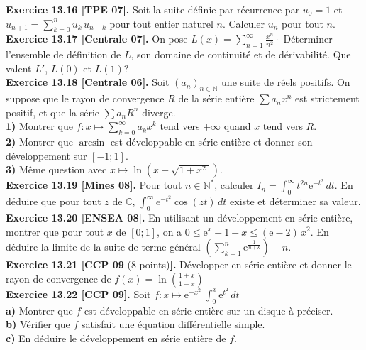 \documentclass[a4paper,12pt,francais]{article}
\newcommand{\field}[1]{\mathbb{#1}}
\newcommand{\N}{\field{N}}
\newcommand{\C}{\field{C}}
\newcommand{\e}{\mbox{e}}
\newcommand{\dis}{\displaystyle}
\begin{document}
\noindent
{\bf Exercice 13.16 [TPE 07].} Soit la suite définie par récurrence par $u_0=1$ et $\displaystyle u_{n+1}=\sum_{k=0}^n u_k \, u_{n-k}$ pour tout entier naturel $n$. Calculer $u_n$ pour tout $n$.\\

\noindent
{\bf Exercice 13.17 [Centrale 07].} On pose $\displaystyle L(x)=\sum_{n=1}^\infty \frac{x^n}{n^2}\cdot$ Déterminer l'ensemble de définition de $L$, son domaine de continuité et de dérivabilité. Que valent $L'$, $L(0)$ et $L(1)$?\\

\noindent
{\bf Exercice 13.18 [Centrale 06].} Soit $(a_n)_{n\in \N}$ une suite de réels positifs. On suppose que le rayon de convergence $R$ de la série entière $\sum a_n x^n$ est strictement positif, et que la série $\sum a_n R^n$ diverge.\\
\indent
{\bf 1)} Montrer que $f:x\mapsto \displaystyle \sum_{k=0}^\infty a_k x^k$ tend vers $+\infty$ quand $x$ tend vers $R$.\\
\indent
{\bf 2)} Montrer que $\arcsin$ est développable en série entière et donner son développement sur $[-1;1]$.\\
\indent
{\bf 3)} Même question avec $x\mapsto \ln \left( x+\sqrt{1+x^2\;} \right)$.\\

\noindent
{\bf Exercice 13.19 [Mines 08].} Pour tout $n\in \N^*$, calculer $I_n=\int_0^\infty t^{2n} \e^{-t^2}\, dt$. En déduire que pour tout $z$ de $\C$, $\int_0^\infty e^{-t^2} \cos(zt)\, dt$ existe et déterminer sa valeur.\\  

\noindent
{\bf Exercice 13.20 [ENSEA 08].} En utilisant un développement en série entière, montrer que pour tout $x$ de $[0;1]$, on a 
$0 \leqslant \e^x-1-x \leqslant (\e-2) \,x^2$. En déduire la limite de la suite de terme général $\displaystyle \left( 
\sum_{k=1}^n \e^{\frac{1}{n+k}} \right) -n$.\\

\noindent
{\bf Exercice 13.21 [CCP 09} (8 points){\bf].}  Développer en série entière et donner le rayon de convergence de $f(x)=\ln \left( \frac{1+x}{1-x}\right)$\\

\noindent
{\bf Exercice 13.22 [CCP 09].} 
Soit $f:x\mapsto \dis \e^{-x^2}\; \int_0^x \e^{t^2}\, dt$\\
{\bf a)} Montrer que $f$ est développable en série entière sur un disque à préciser.\\
{\bf b)} Vérifier que $f$ satisfait une équation différentielle simple.\\
{\bf c)} En déduire le développement en série entière de $f$.\\
\end{document}
